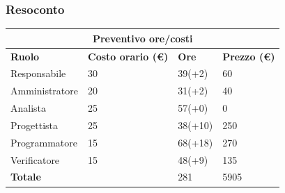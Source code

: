 \documentclass[12pt]{article}
\begin{document}
\subsubsection{Resoconto}
\begin{center}
	\begin{tabularx}{\textwidth}{|X|X|X|X|}
		\hline
		\multicolumn{4}{|c|}{\textbf{Preventivo ore/costi}}                                      \\
		\hline
		\hline
		\textbf{Ruolo}  & \textbf{Costo orario (\euro)} & \textbf{Ore} & \textbf{Prezzo (\euro)} \\
		\hline
		Responsabile    & 30                            & 39(+2)       & 60                      \\
		\hline
		Amministratore  & 20                            & 31(+2)       & 40                      \\
		\hline
		Analista        & 25                            & 57(+0)       & 0                       \\
		\hline
		Progettista     & 25                            & 38(+10)       & 250                     \\
		\hline
		Programmatore   & 15                            & 68(+18)       & 270                     \\
		\hline
		Verificatore    & 15                            & 48(+9)       & 135                      \\
		\hline
		\hline
		\textbf{Totale} &                               & 281          & 5905                    \\
		\hline
	\end{tabularx}\\[8pt]
	\mbox{}\\
\end{center}
\end{document}
